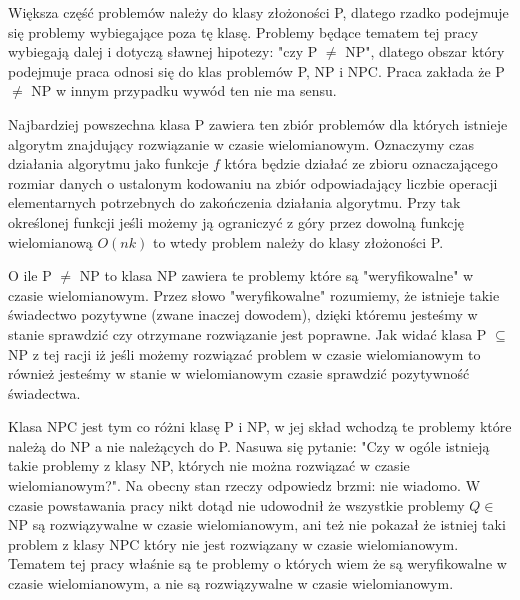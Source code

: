 Większa część problemów należy do klasy złożoności P, dlatego rzadko podejmuje się problemy wybiegające poza tę klasę. Problemy będące tematem tej pracy wybiegają dalej i dotyczą sławnej hipotezy: "czy P $\ne$ NP", dlatego obszar który podejmuje praca odnosi się do klas problemów P, NP i NPC. Praca zakłada że P $\ne$ NP w innym przypadku wywód ten nie ma sensu.%

Najbardziej powszechna klasa P zawiera ten zbiór problemów dla których istnieje algorytm znajdujący rozwiązanie w czasie wielomianowym. Oznaczymy czas działania algorytmu jako funkcje $f$ która będzie działać ze zbioru oznaczającego rozmiar danych o ustalonym kodowaniu na zbiór odpowiadający liczbie operacji elementarnych potrzebnych do zakończenia działania algorytmu. Przy tak określonej funkcji jeśli możemy ją ograniczyć z góry przez dowolną funkcję wielomianową $O(nk)$ to wtedy problem należy do klasy złożoności P.

O ile P $\ne$ NP to klasa NP zawiera te problemy które są "weryfikowalne" w czasie wielomianowym. Przez słowo "weryfikowalne" rozumiemy, że istnieje takie świadectwo pozytywne (zwane inaczej dowodem), dzięki któremu jesteśmy w stanie sprawdzić czy otrzymane rozwiązanie jest poprawne. Jak widać klasa P $\subseteq$ NP z tej racji iż jeśli możemy rozwiązać problem w czasie wielomianowym to również jesteśmy w stanie w wielomianowym czasie sprawdzić pozytywność świadectwa.

Klasa NPC jest tym co różni klasę P i NP, w jej skład wchodzą te problemy które należą do NP a nie należących do P. Nasuwa się pytanie: "Czy w ogóle istnieją takie problemy z klasy NP, których nie można rozwiązać w czasie wielomianowym?". Na obecny stan rzeczy odpowiedz brzmi: nie wiadomo. W czasie powstawania pracy nikt dotąd nie udowodnił że wszystkie problemy $Q\in$ NP są rozwiązywalne w czasie wielomianowym, ani też nie pokazał że istniej taki problem z klasy NPC który nie jest rozwiązany w czasie wielomianowym. Tematem tej pracy właśnie są te problemy o których wiem że są weryfikowalne w czasie wielomianowym, a nie są rozwiązywalne w czasie wielomianowym.



